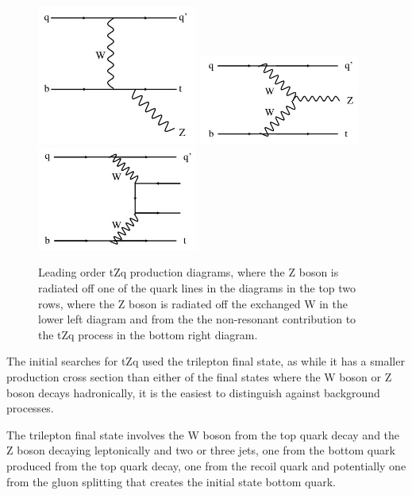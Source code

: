 \begin{figure}[htbp]
\includegraphics[width=0.47\textwidth]{figs/top-physics/tZq_feyn4.jpg}
\includegraphics[width=0.47\textwidth]{figs/top-physics/tZq_feyn5.jpg}
\includegraphics[width=0.47\textwidth]{figs/top-physics/tZq_feyn6.jpg}
\caption{Leading order tZq production diagrams, where the Z boson is radiated off one of the quark lines in the diagrams in the top two rows, where the Z boson is radiated off the exchanged W in the lower left diagram and from the the non-resonant contribution to the tZq process in the bottom right diagram.}
\label{fig:feyn_tZq}
\end{figure}

The initial searches for tZq used the trilepton final state, as while it has a smaller production cross section than either of the final states where the W boson or Z boson decays hadronically, it is the easiest to distinguish against background processes.

The trilepton final state involves the W boson from the top quark decay and the Z boson decaying leptonically and two or three jets, one from the bottom quark produced from the top quark decay, one from the recoil quark and potentially one from the gluon splitting that creates the initial state bottom quark.

